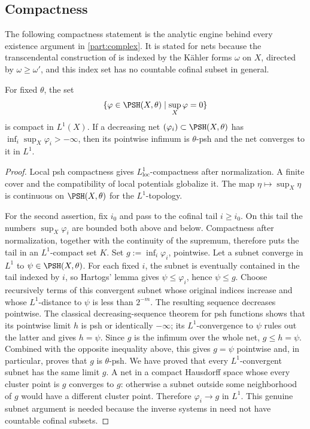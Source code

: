 \subsection{Compactness}
\label{sec:ch51-compactness}

The following compactness statement is the analytic engine behind every
existence argument in \cref{part:complex}.  It is stated for nets because
the transcendental construction of 
is indexed by the K\"ahler forms \(\omega\) on \(X\), directed by
\(\omega\geq\omega'\), and this index set has no countable cofinal subset
in general.

\begin{proposition}\label{prop:complex-l1-compactness}
For fixed \(\theta\), the set
\[
     \{\varphi\in\PSH(X,\theta)\mid \sup_X\varphi=0\}
\]
is compact in \(L^1(X)\).  If a decreasing net
\((\varphi_i)\subset\PSH(X,\theta)\) has
\(\inf_i\sup_X\varphi_i>-\infty\), then its pointwise infimum is
\(\theta\)-psh and the net converges to it in \(L^1\).
\end{proposition}

\begin{proof}
Local psh compactness gives \(L^1_{\mathrm{loc}}\)-compactness after
normalization.  A finite cover and the compatibility of local potentials
globalize it.  The map
\(\eta\mapsto\sup_X\eta\) is continuous on
\(\PSH(X,\theta)\) for the \(L^1\)-topology.

For the second assertion, fix \(i_0\) and pass to the cofinal tail
\(i\geq i_0\).  On this tail the numbers \(\sup_X\varphi_i\) are bounded
both above and below.  Compactness after normalization, together with
the continuity of the supremum, therefore puts the tail in an
\(L^1\)-compact set \(K\).
Set \(g:=\inf_i\varphi_i\), pointwise.  Let a subnet converge in
\(L^1\) to \(\psi\in\PSH(X,\theta)\).  For each fixed \(i\), the subnet
is eventually contained in the tail indexed by \(i\), so Hartogs'
lemma gives \(\psi\leq\varphi_i\), hence \(\psi\leq g\).
Choose recursively terms of this convergent subnet whose original
indices increase and whose \(L^1\)-distance to \(\psi\) is less than
\(2^{-m}\).  The resulting sequence decreases pointwise.  The classical
decreasing-sequence theorem for psh functions shows that its pointwise
limit \(h\) is psh or identically \(-\infty\); its \(L^1\)-convergence
to \(\psi\) rules out the latter and gives \(h=\psi\).  Since \(g\) is
the infimum over the whole net, \(g\leq h=\psi\).  Combined with the
opposite inequality above, this gives \(g=\psi\) pointwise and, in
particular, proves that \(g\) is \(\theta\)-psh.  We have proved that every
\(L^1\)-convergent subnet has the same limit \(g\).  A net in a compact
Hausdorff space whose every cluster point is \(g\) converges to \(g\):
otherwise a subnet outside some neighborhood of \(g\) would have a
different cluster point.  Therefore \(\varphi_i\to g\) in \(L^1\).
This genuine subnet argument is needed because the inverse systems in
 need not have countable
cofinal subsets.
\end{proof}

